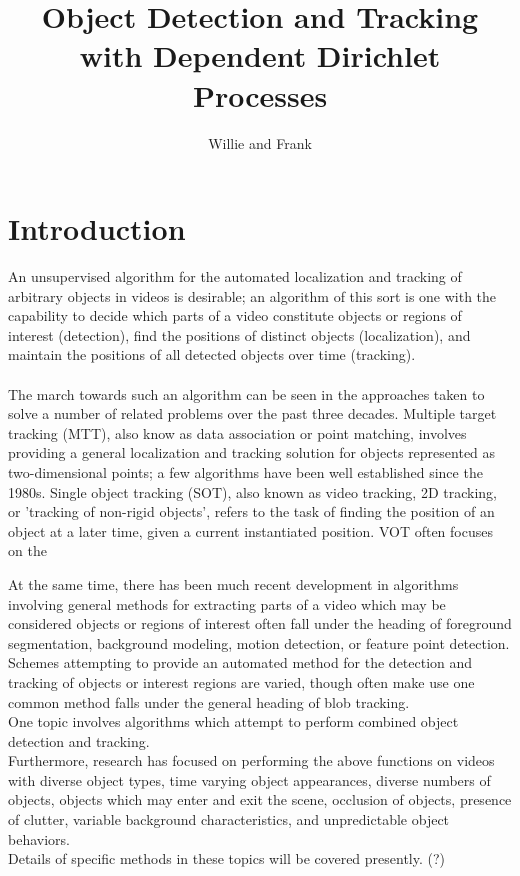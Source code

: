 \documentclass{article}
\begin{document}
\title{Object Detection and Tracking with Dependent Dirichlet Processes}
\author{Willie and Frank}
\maketitle
\mbox{}




\section*{Introduction}
An unsupervised algorithm for the automated localization and tracking of arbitrary objects in videos is desirable; an algorithm of this sort is one with the capability to decide which parts of a video constitute objects or regions of interest (detection), find the positions of distinct objects (localization), and maintain the positions of all detected objects over time (tracking).
\\
\\
The march towards such an algorithm can be seen in the approaches taken to solve a number of related problems over the past three decades. Multiple target tracking (MTT), also know as data association or point matching, involves providing a general localization and tracking solution for objects represented as two-dimensional points; a few algorithms have been well established since the 1980s. Single object tracking (SOT), also known as video tracking, 2D tracking, or 'tracking of non-rigid objects', refers to the task of finding the position of an object at a later time, given a current instantiated position. VOT often focuses on the 

At the same time, there has been much recent development in algorithms involving general methods for extracting parts of a video which may be considered objects or regions of interest often fall under the heading of foreground segmentation, background modeling, motion detection, or feature point detection. Schemes attempting to provide an automated method for the detection and tracking of objects or interest regions are varied, though often make use one common method falls under the general heading of blob tracking.
\\
One topic involves algorithms which attempt to perform combined object detection and tracking.
\\
Furthermore, research has focused on performing the above functions on videos with diverse object types, time varying object appearances, diverse numbers of objects, objects which may enter and exit the scene, occlusion of objects, presence of clutter, variable background characteristics, and unpredictable object behaviors.
\\
Details of specific methods in these topics will be covered presently. (?)
\\
\
\\
\end{document}
